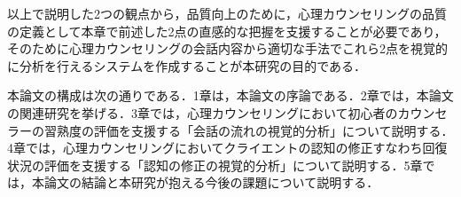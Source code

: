 \documentclass[shuuron]{kuee}
\begin{document}




以上で説明した2つの観点から，品質向上のために，心理カウンセリングの品質の定義として本章で前述した2点の直感的な把握を支援することが必要であり，そのために心理カウンセリングの会話内容から適切な手法でこれら2点を視覚的に分析を行えるシステムを作成することが本研究の目的である．

本論文の構成は次の通りである．1章は，本論文の序論である．2章では，本論文の関連研究を挙げる．3章では，心理カウンセリングにおいて初心者のカウンセラーの習熟度の評価を支援する「会話の流れの視覚的分析」について説明する．4章では，心理カウンセリングにおいてクライエントの認知の修正すなわち回復状況の評価を支援する「認知の修正の視覚的分析」について説明する．5章では，本論文の結論と本研究が抱える今後の課題について説明する．

%


%
\end{document}
